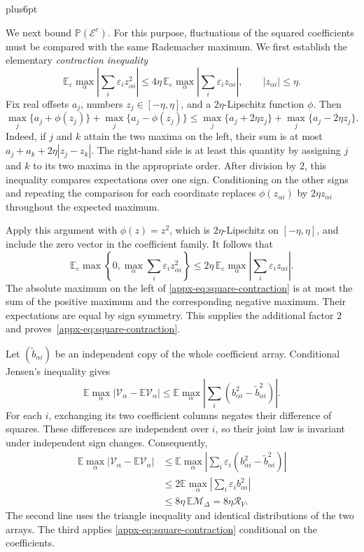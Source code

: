 \documentclass[11pt,letterpaper,twoside,leqno]{article}
\makeatletter
\theoremstyle{bookplain}
\theoremstyle{bookremark}
\renewenvironment{proof}[1][\proofname]{\par
  \pushQED{\qed}\normalfont\topsep6pt plus6pt\relax
  \trivlist\item[\hskip\labelsep\bfseries #1\@addpunct{.}]\ignorespaces
}{\popQED\endtrivlist\@endpefalse}
\newcommand{\E}{\mathbb E}
\newcommand{\Pp}{\mathbb P}
\makeatother
\begin{document}
\begin{proof}[Proof of Lemma~\ref{lem:concentration}]
We next bound $\Pp(\mathcal E^c)$. For this purpose, fluctuations
of the squared coefficients must be compared with the same
Rademacher maximum. We first establish the elementary
\emph{contraction inequality}
\begin{equation}
 \E_\varepsilon\max_\alpha
       \left|\sum_i\varepsilon_i z_{\alpha i}^2\right|
 \le4\eta\,\E_\varepsilon\max_\alpha
       \left|\sum_i\varepsilon_i z_{\alpha i}\right|,
 \qquad |z_{\alpha i}|\le\eta.
 \label{appx-eq:square-contraction}
\end{equation}
Fix real offsets $a_j$, numbers $z_j\in[-\eta,\eta]$, and a
$2\eta$-Lipschitz function $\phi$. Then
\[
 \max_j\{a_j+\phi(z_j)\}+\max_j\{a_j-\phi(z_j)\}
 \le\max_j\{a_j+2\eta z_j\}+\max_j\{a_j-2\eta z_j\}.
\]
Indeed, if $j$ and $k$ attain the two maxima on the left, their
sum is at most $a_j+a_k+2\eta|z_j-z_k|$.
The right-hand side is at least this quantity by assigning $j$
and $k$ to its two maxima in the appropriate order.
After division by $2$, this inequality compares expectations over
one sign. Conditioning on the other signs and repeating the
comparison for each coordinate replaces $\phi(z_{\alpha i})$
by $2\eta z_{\alpha i}$ throughout the expected maximum.

Apply this argument with $\phi(z)=z^2$, which is
$2\eta$-Lipschitz on $[-\eta,\eta]$, and include the zero vector
in the coefficient family. It follows that
\[
 \E_\varepsilon\max\left\{0,\max_\alpha
                     \sum_i\varepsilon_i z_{\alpha i}^2\right\}
 \le2\eta\,\E_\varepsilon\max_\alpha
                    \left|\sum_i\varepsilon_i z_{\alpha i}\right|.
\]
The absolute maximum on the left of
\eqref{appx-eq:square-contraction} is at most the sum of the positive
maximum and the corresponding negative maximum. Their expectations
are equal by sign symmetry. This supplies the additional factor
$2$ and proves~\eqref{appx-eq:square-contraction}.

Let $(\widetilde b_{\alpha i})$ be an independent copy of the
whole coefficient array. Conditional Jensen's inequality gives
\[
 \E\max_\alpha|\mathcal V_\alpha-\E\mathcal V_\alpha|
 \le\E\max_\alpha
       \left|\sum_i(b_{\alpha i}^2-\widetilde b_{\alpha i}^2)\right|.
\]
For each $i$, exchanging its two coefficient columns negates their
difference of squares. These differences are independent over $i$,
so their joint law is invariant under independent sign changes.
Consequently,
\[
 \begin{aligned}
 \E\max_\alpha|\mathcal V_\alpha-\E\mathcal V_\alpha|
 &\le\E\max_\alpha\left|\sum_i\varepsilon_i
                  (b_{\alpha i}^2-\widetilde b_{\alpha i}^2)\right|\\
 &\le2\E\max_\alpha\left|\sum_i\varepsilon_i b_{\alpha i}^2\right|\\
 &\le8\eta\,\E\mathcal M_\Delta=8\eta\mathcal R_V.
 \end{aligned}
\]
The second line uses the triangle inequality and identical
distributions of the two arrays. The third applies
\eqref{appx-eq:square-contraction} conditional on the coefficients.


\end{proof}
\end{document}
